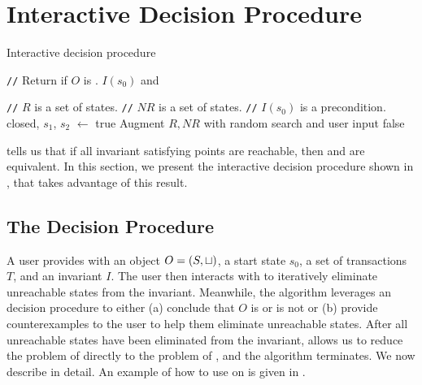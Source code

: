 \section{Interactive Decision Procedure}
\newcommand{\Helper}{\textsc{Helper}}
\newcommand{\IsIclosed}{\textsc{IsIclosed}}
\newcommand{\IsInvConfluent}{\textsc{IsInvConfluent}}

\newcommand{\algocomment}[1]{\State \textcolor{flatdenim}{\texttt{//} #1}}
\begin{algorithm}[t]
  \caption{Interactive \invariantconfluence{} decision procedure}%
  \begin{algorithmic}
    \algocomment{Return if $O$ is \sTIconfluent{}.}
      \State
        \Return $I(s_0)$ and
    \EndFunction

    \State

    \algocomment{$R$ is a set of \sTIreachable{} states.}
    \algocomment{$NR$ is a set of \sTIunreachable{} states.}
    \algocomment{$I(s_0)$ is a precondition.}
      \State closed, $s_1$, $s_2$ $\gets$ 
        \Return true
      \EndIf
      \State Augment $R, NR$ with random search and user input
        \Return false
      \EndIf
      \State \Return {}
    \EndFunction
  \end{algorithmic}
\end{algorithm}

 tells us that if all invariant
satisfying points are reachable, then \invariantclosure{} and
\invariantconfluence{} are equivalent. In this section, we present the
interactive \invariantconfluence{} decision procedure shown in
, that takes advantage of this result.

\subsection{The Decision Procedure}
A user provides  with an object $O = (S,
\sqcup)$, a start state $s_0$, a set of transactions $T$, and an invariant
$I$. The user then interacts with  to
iteratively eliminate unreachable states from the invariant. Meanwhile, the
algorithm leverages an \invariantclosure{} decision procedure to either (a)
conclude that $O$ is or is not \sTIconfluent{} or (b) provide counterexamples
to the user to help them eliminate unreachable states. After all unreachable
states have been eliminated from the invariant,
 allows us to reduce the problem of
\invariantconfluence{} directly to the problem of \invariantclosure{}, and the
algorithm terminates.
%
We now describe  in detail. An example of
how to use  on  is given
in .

